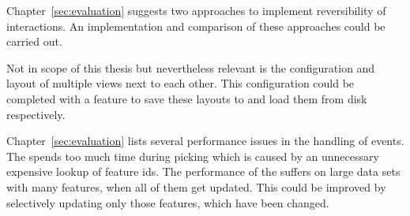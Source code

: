 Chapter~\ref{sec:evaluation} suggests two approaches to implement reversibility of interactions.
An implementation and comparison of these approaches could be carried out.

Not in scope of this thesis but nevertheless relevant is the configuration and layout of multiple views next to each other.
This configuration could be completed with a feature to save these layouts to and load them from disk respectively.

Chapter~\ref{sec:evaluation} lists several performance issues in the handling of  events.
The \tmap{} spends too much time during picking which is caused by an unnecessary expensive lookup of feature ids.
The performance of the \gv{} suffers on large data sets with many features, when all of them get updated.
This could be improved by selectively updating only those features, which have been changed.




